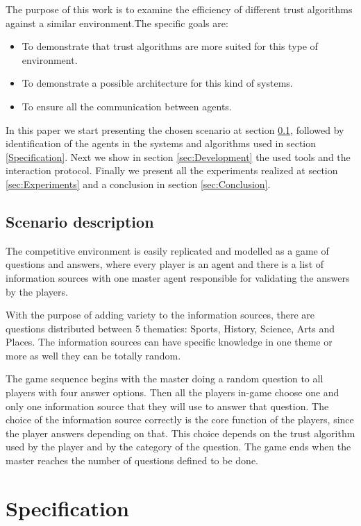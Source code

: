 \documentclass{llncs}
\begin{document}
The purpose of this work is to examine the efficiency of different trust algorithms against a similar environment.The specific goals are:
\begin{itemize}
\item To demonstrate that trust algorithms are more suited for this type of environment.
\item To demonstrate a possible architecture for this kind of systems.
\item To ensure all the communication between agents.
\end{itemize}

In this paper we start presenting the chosen scenario at section \ref{Scenario description}, followed by identification of the agents in the systems and algorithms used in section \ref{Specification}. Next we show in section \ref{sec:Development} the used tools and the interaction protocol. Finally we present all the experiments realized at section \ref{sec:Experiments} and a conclusion in section \ref{sec:Conclusion}.

\subsection{Scenario description}\label{Scenario description}

The competitive environment is easily replicated and modelled as a game of questions and answers, where every player is an agent and there is a list of information sources with one master agent responsible for validating the answers by the players.

With the purpose of adding variety to the information sources, there are questions distributed between 5 thematics: Sports, History, Science, Arts and Places. The information sources can have specific knowledge in one theme or more as well they can be totally random.

The game sequence begins with the master doing a random question to all players with four answer options. Then all the players in-game choose one and only one information source that they will use to answer that question. The choice of the information source correctly is the core function of the players, since the player answers depending on that. This choice depends on the trust algorithm used by the player and by the category of the question. The game ends when the master reaches the number of questions defined to be done.

\section{Specification}\label{sec:Specification}
\end{document}

